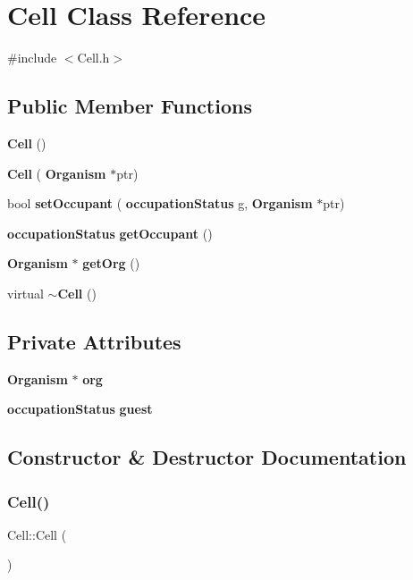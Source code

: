 \section{Cell Class Reference}
\label{classCell}


{\ttfamily \#include $<$Cell.\+h$>$}

\subsection*{Public Member Functions}
\begin{DoxyCompactItemize}
\item 
\textbf{ Cell} ()
\item 
\textbf{ Cell} (\textbf{ Organism} $\ast$ptr)
\item 
bool \textbf{ set\+Occupant} (\textbf{ occupation\+Status} g, \textbf{ Organism} $\ast$ptr)
\item 
\textbf{ occupation\+Status} \textbf{ get\+Occupant} ()
\item 
\textbf{ Organism} $\ast$ \textbf{ get\+Org} ()
\item 
virtual \textbf{ $\sim$\+Cell} ()
\end{DoxyCompactItemize}
\subsection*{Private Attributes}
\begin{DoxyCompactItemize}
\item 
\textbf{ Organism} $\ast$ \textbf{ org}
\item 
\textbf{ occupation\+Status} \textbf{ guest}
\end{DoxyCompactItemize}


\subsection{Constructor \& Destructor Documentation}
\mbox{\label{classCell_a394510643e8664cf12b5efaf5cb99f71}} 
\subsubsection{Cell()\hspace{0.1cm}{\footnotesize\ttfamily [1/2]}}
{\footnotesize\ttfamily Cell\+::\+Cell (\begin{DoxyParamCaption}{ }\end{DoxyParamCaption})}

